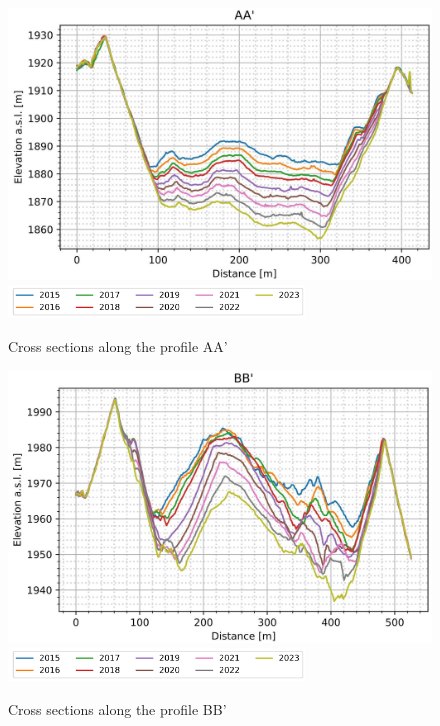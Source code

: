 \begin{figure}[p]
    \centering
    \includegraphics[width=\textwidth]{figures/appendix/profile_A.jpg}\\
    \includegraphics[width=0.7\textwidth]{figures/chapter3/profiles_legend.png}
    \caption[]{Cross sections along the profile AA'}
\end{figure}

\begin{figure}[p]
    \centering
    \includegraphics[width=\textwidth]{figures/appendix/profile_B.jpg}\\
    \includegraphics[width=0.7\textwidth]{figures/chapter3/profiles_legend.png}
    \caption[]{Cross sections along the profile BB'}
\end{figure}


